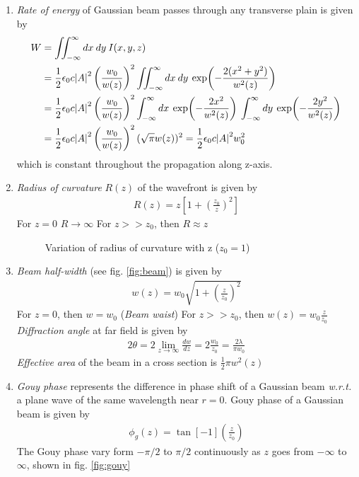 \documentclass[11pt,a4paper]{article}
\numberwithin{equation}{section}
\begin{document}
\begin{enumerate}
	\item
	\textit{Rate of energy} of Gaussian beam passes through any transverse plain is given by
	\begin{align}
		W&= \iint_{-\infty}^{\infty} dx\:dy\:I(x,y,z)\nonumber\\
		&= \frac{1}{2} \epsilon_0c \abs{A}^2 \left(\frac{w_0}{w(z)}\right)^2 \iint_{-\infty}^{\infty} dx\:dy\: \exp(-\frac{2(x^2+y^2)}{w^2(z)}\nonumber)\\
		&= \frac{1}{2} \epsilon_0c \abs{A}^2 \left(\frac{w_0}{w(z)}\right)^2 \int_{-\infty}^{\infty} dx\: \exp(-\frac{2x^2}{w^2(z)})\: \int_{-\infty}^{\infty} dy\: \exp(-\frac{2y^2}{w^2(z)})\nonumber\\
		&=  \frac{1}{2}\epsilon_0c \abs{A}^2 \left(\frac{w_0}{w(z)}\right)^2 (\sqrt{\pi} w(z))^2 = \frac{1}{2}\epsilon_0c \abs{A}^2 w_0^2
	\end{align} which is constant throughout the propagation along z-axis.
	
	\item
	\textit{Radius of curvature} $R(z)$ of the wavefront is given by
	\begin{align}
		R(z)= z\left[1+\left(\frac{z_0}{z}\right)^2\right]
	\end{align}
	\subitem For $z=0$ $R\rightarrow\infty$
	\subitem For $z>>z_0$, then $R\approx z$
	
	\begin{figure}[H]
		\centering
		\scalebox{0.7}{}
		\caption{Variation of radius of curvature with z ($z_0=1$)}
		\label{fig:R vs z}
	\end{figure}
	
	\item
	\textit{Beam half-width} (see fig. \ref{fig:beam}) is given by 
	\begin{align}
		w(z)= w_0\sqrt{1+\left(\frac{z}{z_0}\right)^2}
	\end{align}
	\subitem For $z=0$, then $w = w_0$ (\textit{Beam waist})
	\subitem For $z>>z_0$, then $w(z)= w_0\frac{z}{z_0}$
	\subitem \textit{Diffraction angle} at far field is given by 
	\begin{align}
		2\theta = 2\lim_{z\to\infty}\frac{dw}{dz} = 2\frac{w_0}{z_0} = \frac{2\lambda}{\pi w_0}
	\end{align}
	\subitem \textit{Effective area} of the beam in a cross section is $\displaystyle \frac{1}{2} \pi w^2(z)$
	
	\item 
	\textit{Gouy phase} represents the difference in phase shift of a Gaussian beam \textit{w.r.t.} a plane wave of the same wavelength near $r=0$. \cite{conry 12}
	Gouy phase of a Gaussian beam is given by
	\begin{align}
		\phi_g (z) = \tan[-1](\frac{z}{z_0})
	\end{align}
	The Gouy phase vary form $-\pi/2$ to $\pi/2$ continuously as $z$ goes from $-\infty$ to $\infty$, shown in fig. \ref{fig:gouy}
	

\end{enumerate}
\end{document}
